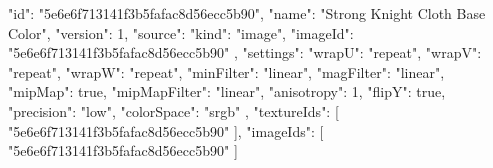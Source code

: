 {
  "id": "5e6e6f713141f3b5fafac8d56ecc5b90",
  "name": "Strong Knight Cloth Base Color",
  "version": 1,
  "source": {
    "kind": "image",
    "imageId": "5e6e6f713141f3b5fafac8d56ecc5b90"
  },
  "settings": {
    "wrapU": "repeat",
    "wrapV": "repeat",
    "wrapW": "repeat",
    "minFilter": "linear",
    "magFilter": "linear",
    "mipMap": true,
    "mipMapFilter": "linear",
    "anisotropy": 1,
    "flipY": true,
    "precision": "low",
    "colorSpace": "srgb"
  },
  "textureIds": [
    "5e6e6f713141f3b5fafac8d56ecc5b90"
  ],
  "imageIds": [
    "5e6e6f713141f3b5fafac8d56ecc5b90"
  ]
}
